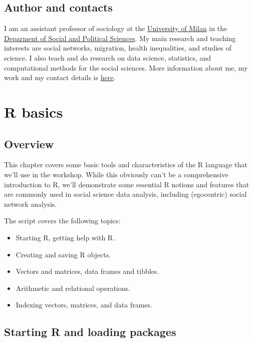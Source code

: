 \documentclass[
]{book}
\providecommand{\tightlist}{%
  \setlength{\itemsep}{0pt}\setlength{\parskip}{0pt}}
\begin{document}
\hypertarget{author-and-contacts}{%
\section{Author and contacts}\label{author-and-contacts}}

I am an assistant professor of sociology at the \href{https://www.unimi.it/en}{University of Milan} in the \href{http://eng.sps.unimi.it/ecm/home}{Deparment of Social and Political Sciences}. My main research and teaching interests are social networks, migration, health inequalities, and studies of science. I also teach and do research on data science, statistics, and computational methods for the social sciences. More information about me, my work and my contact details is \href{http://www.raffaelevacca.com/about-me/}{here}.

\hypertarget{basics}{%
\chapter{R basics}\label{basics}}

\hypertarget{overview}{%
\section{Overview}\label{overview}}

This chapter covers some basic tools and characteristics of the R language that we'll use in the workshop. While this obviously can't be a comprehensive introduction to R, we'll demonstrate some essential R notions and features that are commonly used in social science data analysis, including (egocentric) social network analysis.

The script covers the following topics:

\begin{itemize}
\tightlist
\item
  Starting R, getting help with R.
\item
  Creating and saving R objects.
\item
  Vectors and matrices, data frames and tibbles.
\item
  Arithmetic and relational operations.
\item
  Indexing vectors, matrices, and data frames.
\end{itemize}

\hypertarget{starting-R-and-loading-packages}{%
\section{Starting R and loading packages}\label{starting-R-and-loading-packages}}
\end{document}
